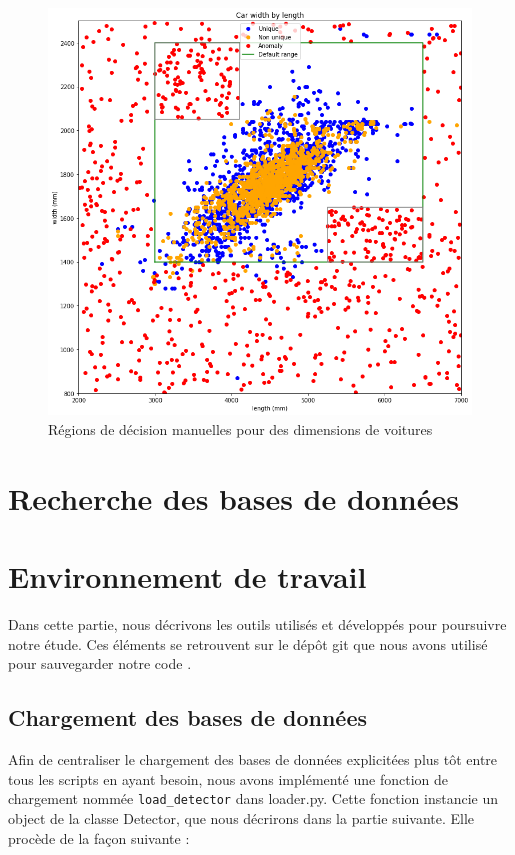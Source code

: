 \documentclass[a4paper]{report}
\begin{document}
\begin{figure}
\centering
\includegraphics[width=\textwidth]{img/first_try.png}
\caption{Régions de décision manuelles pour des dimensions de voitures\label{regions_decision_manuelles_plot}}
\end{figure}

\section{Recherche des bases de données}


\section{Environnement de travail}

Dans cette partie, nous décrivons les outils utilisés et développés pour poursuivre notre étude. Ces éléments se retrouvent sur le dépôt git que nous avons utilisé pour sauvegarder notre code \cite{git}.

\subsection{Chargement des bases de données}

Afin de centraliser le chargement des bases de données explicitées plus tôt entre tous les scripts en ayant besoin, nous avons implémenté une fonction de chargement nommée \texttt{load\_detector} dans loader.py. Cette fonction instancie un object de la classe Detector, que nous décrirons dans la partie suivante. Elle procède de la façon suivante :
\end{document}
